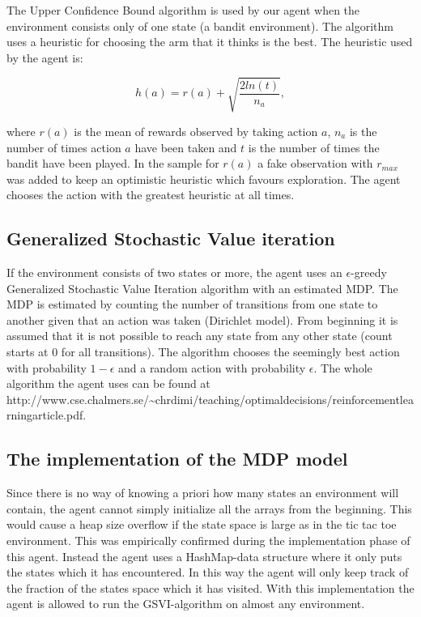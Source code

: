 \documentclass[11pt]{article}
\numberwithin{equation}{section}
\begin{document}
\begin{flushleft}
The Upper Confidence Bound algorithm is used by our agent when the environment consists only of one state (a bandit environment). The algorithm uses a heuristic for choosing the arm that it thinks is the best. The heuristic used by the agent is:

$$h(a) = r(a) + \sqrt{\frac{2ln(t)}{n_a}},$$

where $r(a)$ is the mean of rewards observed by taking action $a$, $n_a$ is the number of times action $a$ have been taken and $t$ is the number of times the bandit have been played. In the sample for $r(a)$ a fake observation with $r_{max}$ was added to keep an optimistic heuristic which favours exploration. The agent chooses the action with the greatest heuristic at all times.

\subsection{Generalized Stochastic Value iteration}

If the environment consists of two states or more, the agent uses an $\epsilon$-greedy Generalized Stochastic Value Iteration algorithm with an estimated MDP. The MDP is estimated by counting the number of transitions from one state to another given that an action was taken (Dirichlet model). From beginning it is assumed that it is not possible to reach any state from any other state (count starts at 0 for all transitions). The algorithm chooses the seemingly best action with probability $1-\epsilon$ and a random action with probability $\epsilon$. The whole algorithm the agent uses can be found at http://www.cse.chalmers.se/\textasciitilde chrdimi/teaching/optimal\textunderscore decisions/reinforcement\textunderscore learning\textunderscore article.pdf.

\subsection{The implementation of the MDP model}

Since there is no way of knowing a priori how many states an environment will contain, the agent cannot simply initialize all the arrays from the beginning. This would cause a heap size overflow if the state space is large as in the tic tac toe environment. This was empirically confirmed during the implementation phase of this agent. Instead the agent uses a HashMap-data structure where it only puts the states which it has encountered. In this way the agent will only keep track of the fraction of the states space which it has visited. With this implementation the agent is allowed to run the GSVI-algorithm on almost any environment.  


\end{flushleft}
\end{document}
